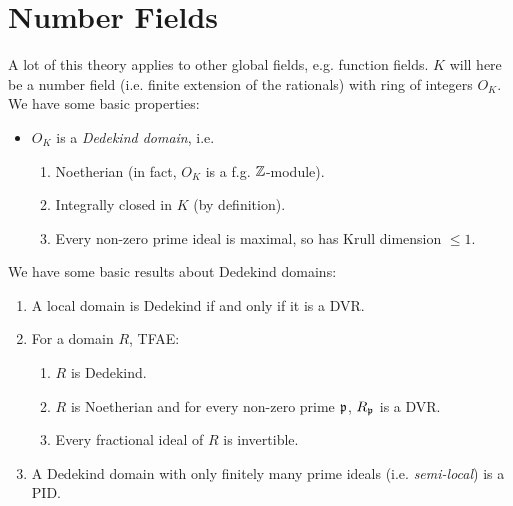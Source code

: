 \documentclass[10pt,a4paper]{article}
\begin{document}
\section{Number Fields}
A lot of this theory applies to other global fields, e.g. function fields. $K$ will here be a number field (i.e. finite extension of the rationals) with ring of integers $O_K$. We have some basic properties:
\begin{itemize}
  \item $O_K$ is a \emph{Dedekind domain}, i.e.
  \begin{enumerate}
    \item Noetherian (in fact, $O_K$ is a f.g. $\mathbb{Z}$-module).
    \item Integrally closed in $K$ (by definition).
    \item Every non-zero prime ideal is maximal, so has Krull dimension $\leq 1$.
  \end{enumerate}
\end{itemize}
We have some basic results about Dedekind domains:
\begin{theorem}\hspace*{0cm}
  \begin{enumerate}
    \item A local domain is Dedekind if and only if it is a DVR.
    \item For a domain $R$, TFAE:
    \begin{enumerate}
      \item $R$ is Dedekind.
      \item $R$ is Noetherian and for every non-zero prime $\mathfrak{p}$, $R_{\mathfrak{p}}$ is a DVR.
      \item Every fractional ideal of $R$ is invertible.
    \end{enumerate}
    \item A Dedekind domain with only finitely many prime ideals (i.e. \emph{semi-local}) is a PID.
  \end{enumerate}
\end{theorem}
\end{document}
